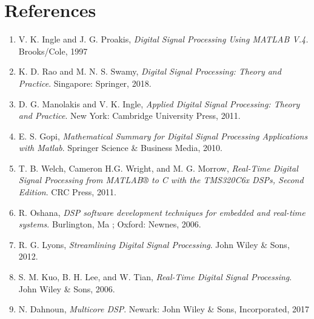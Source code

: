 \documentclass{article}
\begin{document}
\section{References}
\begin{enumerate}
  \setcounter{enumi}{0}  %
  \item  V. K. Ingle and J. G. Proakis, \textit{Digital Signal Processing Using MATLAB V.4.} Brooks/Cole, 1997
  \item K. D. Rao and M. N. S. Swamy, \textit{Digital Signal Processing: Theory and Practice}. Singapore: Springer, 2018.
  \item D. G. Manolakis and V. K. Ingle, \textit{Applied Digital Signal Processing: Theory and Practice}. New York: Cambridge University Press, 2011.
  \item E. S. Gopi, \textit{Mathematical Summary for Digital Signal Processing Applications with Matlab}. Springer Science \& Business Media, 2010.
  \item T. B. Welch, Cameron H.G. Wright, and M. G. Morrow, \textit{Real-Time Digital Signal Processing from MATLAB® to C with the TMS320C6x DSPs, Second Edition}. CRC Press, 2011.
  \item R. Oshana, \textit{DSP software development techniques for embedded and real-time systems}. Burlington, Ma ; Oxford: Newnes, 2006.
  \item R. G. Lyons, \textit{Streamlining Digital Signal Processing}. John Wiley \& Sons, 2012.
  \item S. M. Kuo, B. H. Lee, and W. Tian, \textit{Real-Time Digital Signal Processing}. John Wiley \& Sons, 2006.
  \item N. Dahnoun, \textit{Multicore DSP}. Newark: John Wiley \& Sons, Incorporated, 2017
\end{enumerate}
\end{document}
